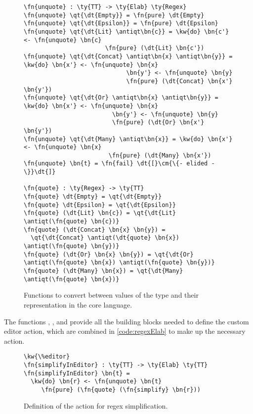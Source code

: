 \begin{figure}
\begin{Verbatim}
\fn{unquote} : \ty{TT} -> \ty{Elab} \ty{Regex}
\fn{unquote} \qt{\dt{Empty}} = \fn{pure} \dt{Empty}
\fn{unquote} \qt{\dt{Epsilon}} = \fn{pure} \dt{Epsilon}
\fn{unquote} \qt{\dt{Lit} \antiqt\bn{c}} = \kw{do} \bn{c'} <- \fn{unquote} \bn{c}
                       \fn{pure} (\dt{Lit} \bn{c'})
\fn{unquote} \qt{\dt{Concat} \antiqt\bn{x} \antiqt\bn{y}} = \kw{do} \bn{x'} <- \fn{unquote} \bn{x}
                             \bn{y'} <- \fn{unquote} \bn{y}
                             \fn{pure} (\dt{Concat} \bn{x'} \bn{y'})
\fn{unquote} \qt{\dt{Or} \antiqt\bn{x} \antiqt\bn{y}} = \kw{do} \bn{x'} <- \fn{unquote} \bn{x}
                         \bn{y'} <- \fn{unquote} \bn{y}
                         \fn{pure} (\dt{Or} \bn{x'} \bn{y'})
\fn{unquote} \qt{\dt{Many} \antiqt\bn{x}} = \kw{do} \bn{x'} <- \fn{unquote} \bn{x}
                        \fn{pure} (\dt{Many} \bn{x'})
\fn{unquote} \bn{t} = \fn{fail} \dt{[}\cm{\{- elided -\}}\dt{]}

\fn{quote} : \ty{Regex} -> \ty{TT}
\fn{quote} \dt{Empty} = \qt{\dt{Empty}}
\fn{quote} \dt{Epsilon} = \qt{\dt{Epsilon}}
\fn{quote} (\dt{Lit} \bn{c}) = \qt{\dt{Lit} \antiqt(\fn{quote} \bn{c})}
\fn{quote} (\dt{Concat} \bn{x} \bn{y}) =
  \qt{\dt{Concat} \antiqt(\dt{quote} \bn{x}) \antiqt(\fn{quote} \bn{y})}
\fn{quote} (\dt{Or} \bn{x} \bn{y}) = \qt{\dt{Or} \antiqt(\fn{quote} \bn{x}) \antiqt(\fn{quote} \bn{y})}
\fn{quote} (\dt{Many} \bn{x}) = \qt{\dt{Many} \antiqt(\fn{quote} \bn{x})}
\end{Verbatim}
\caption{Functions to convert between values of the  type and their representation in the core language.}
\label{code:regexQuote}
\end{figure}

The functions , , and  provide all the
building blocks needed to define the custom editor action, which are combined in
\autoref{code:regexElab} to make up the necessary \Elab{} action.

\begin{figure}[ht]
\begin{Verbatim}
\kw{\%editor}
\fn{simplifyInEditor} : \ty{TT} -> \ty{Elab} \ty{TT}
\fn{simplifyInEditor} \bn{t} =
  \kw{do} \bn{r} <- \fn{unquote} \bn{t}
     \fn{pure} (\fn{quote} (\fn{simplify} \bn{r}))
\end{Verbatim}
\caption{Definition of the \Elab{} action for regex simplification.}
\label{code:regexElab}
\end{figure}

